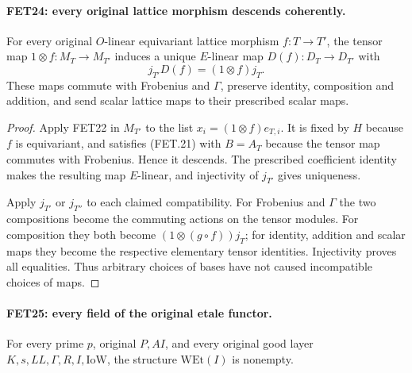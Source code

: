 \documentclass[11pt,a4paper]{article}
\numberwithin{equation}{section}
\theoremstyle{remark}\newtheorem{remark}[theorem]{Remark}
\begin{document}
\paragraph{FET24: every original lattice morphism descends coherently.}
\label{claim:FET24}
For every original $O$-linear equivariant lattice morphism
$f:T\to T'$, the tensor map $1\otimes f:M_T\to M_{T'}$
induces a unique $E$-linear map $D(f):D_T\to D_{T'}$ with
\[
                       j_{T'}D(f)=(1\otimes f)j_T.        \tag{FET.22}
\]
These maps commute with Frobenius and $\Gamma$, preserve identity,
composition and addition, and send scalar lattice maps to their
prescribed scalar maps.

\begin{proof}
Apply FET22 in $M_{T'}$ to the list
$x_i=(1\otimes f)e_{T,i}$. It is fixed by $H$ because $f$
is equivariant, and satisfies (FET.21) with $B=A_T$ because
the tensor map commutes with Frobenius. Hence it descends.
The prescribed coefficient identity makes the resulting map
$E$-linear, and injectivity of $j_{T'}$ gives uniqueness.

Apply $j_{T'}$ or $j_{T''}$ to each claimed compatibility.
For Frobenius and $\Gamma$ the two compositions become the
commuting actions on the tensor modules. For composition they
both become $(1\otimes(g\circ f))j_T$; for identity, addition
and scalar maps they become the respective elementary tensor
identities. Injectivity proves all equalities. Thus arbitrary
choices of bases have not caused incompatible choices of maps.
\end{proof}

\paragraph{FET25: every field of the original etale functor.}
\label{claim:FET25}
For every prime $p$, original $P,AI$, and every original good
layer $K,s,LL,\Gamma,R,I,\mathrm{IoW}$, the structure
$\mathrm{WEt}(I)$ is nonempty.
\end{document}
